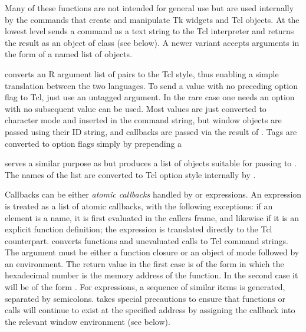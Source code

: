 \begin{Details}\relax
Many of these functions are not intended for general use but are used
internally by the commands that create and manipulate Tk widgets and
Tcl objects.  At the lowest level  sends a command as a text
string to the Tcl interpreter and returns the result as an object of
class  (see below).  A newer variant 
accepts arguments in the form of a named list of 
objects. 

 converts an R argument list of  pairs
to the Tcl  style, thus
enabling a simple translation between the two languages. To send a
value with no preceding option flag to Tcl, just use an untagged
argument. In the rare case one needs an option with no subsequent
value  can be used. Most values are just converted to
character mode and inserted in the command string, but window objects
are passed using their ID string, and callbacks are passed via the
result of . Tags are converted to option flags
simply by prepending a \code{-}

 serves a similar purpose as  but
produces a list of  objects suitable for passing to
. The names of the list are converted to Tcl option
style internally by . 

Callbacks can be either \emph{atomic callbacks} handled by
 or expressions. An expression is treated as a
list of atomic callbacks, with the following exceptions: if an
element is a name, it is first evaluated in the callers frame, and
likewise if it is an explicit function definition; the 
expression is translated directly to the Tcl counterpart.
 converts \R{} functions and unevaluated calls to
Tcl command strings.  The argument must be either a function closure
or an object of mode  followed by an environment.  The
return value in the first case is of the form  in which the hexadecimal number is the memory address of
the function. In the second case it will be of the form
. For expressions, a sequence
of similar items is generated, separated by
semicolons.  takes special precautions to ensure
that functions or calls will continue to exist at the specified
address by assigning the
callback into the relevant window environment (see below).


\end{Details}

